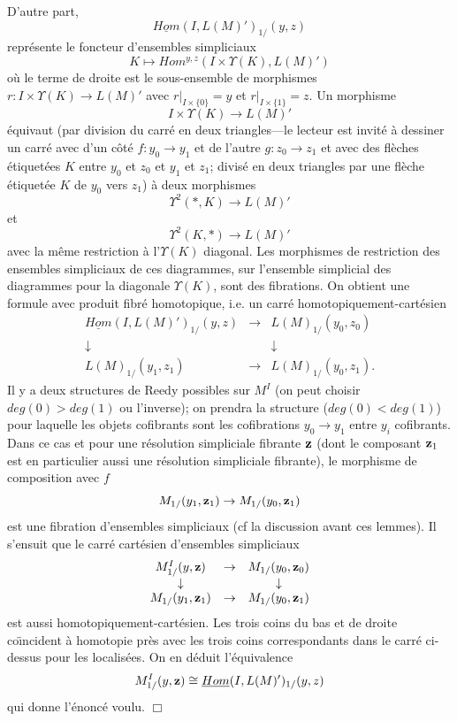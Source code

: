 \documentclass[12pt]{article}
\newcommand{\eop}{\hfill $\Box$\vspace{.1in}}
\begin{document}
D'autre part,
$$
\underline{Hom}(I, L(M)')_{1/}(y,z)
$$
repr\'esente le foncteur d'ensembles simpliciaux
$$
K\mapsto Hom ^{y,z}(I\times \Upsilon (K), L(M)')
$$
o\`u le terme de droite est le sous-ensemble de morphismes
$r:I\times \Upsilon (K)\rightarrow L(M)'$ avec $r|_{I\times \{ 0\} } = y$
et $r|_{I\times \{ 1\} } = z$. Un morphisme
$$
I\times \Upsilon (K)\rightarrow L(M)'
$$
\'equivaut (par division du carr\'e en deux triangles---le lecteur
est invit\'e \`a
dessiner un carr\'e avec d'un c\^ot\'e $f: y_0\rightarrow y_1$ et de l'autre $g:
z_0\rightarrow z_1$ et avec des fl\`eches \'etiquet\'ees $K$ entre $y_0$ et
$z_0$
et $y_1$ et $z_1$; divis\'e en deux triangles par une fl\`eche \'etiquet\'ee $K$
de $y_0$ vers $z_1$) \`a deux morphismes
$$
\Upsilon ^2(\ast , K)\rightarrow
L(M)' $$ et
$$
\Upsilon ^2(K,\ast )\rightarrow L(M)'
$$
avec la m\^eme restriction \`a l'$\Upsilon (K)$ diagonal. Les
morphismes de restriction des ensembles simpliciaux de ces diagrammes, sur
l'ensemble simplicial des diagrammes pour la diagonale $\Upsilon (K)$, sont
des fibrations. On obtient une formule avec produit fibr\'e homotopique,
i.e. un carr\'e homotopiquement-cart\'esien
$$
\begin{array}{ccc}
\underline{Hom}(I, L(M)')_{1/}(y,z)&\rightarrow & L(M)_{1/}(y_0, z_0)\\
\downarrow && \downarrow \\
L(M)_{1/}(y_1, z_1) & \rightarrow &  L(M)_{1/}(y_0, z_1).
\end{array}
$$
Il y a deux structures de Reedy possibles sur $M^I$ (on peut
choisir $deg(0)>deg(1)$ ou l'inverse);  on prendra la structure ($deg(0) <
deg (1)$) pour laquelle les objets cofibrants sont les cofibrations
$y_0\rightarrow y_1$ entre $y_i$ cofibrants. Dans ce cas et pour une
r\'esolution simpliciale fibrante ${\bf z}$ (dont le composant ${\bf z}_1$
est en
particulier aussi une r\'esolution simpliciale fibrante), le morphisme de
composition avec $f$
$$
M_{1/}(y_1, {\bf z}_1)\rightarrow M_{1/}(y_0, {\bf z}_1)
$$
est une fibration d'ensembles simpliciaux (cf la discussion avant ces lemmes).
Il s'ensuit que  le carr\'e cart\'esien d'ensembles simpliciaux
$$
\begin{array}{ccc}
M^I_{1/}(y,{\bf z}) & \rightarrow &  M_{1/}(y_0,{\bf z}_0)\\
\downarrow && \downarrow \\
M_{1/}(y_1,{\bf z}_1)& \rightarrow & M_{1/}(y_0,{\bf z}_1)
\end{array}
$$
est aussi homotopiquement-cart\'esien. Les trois coins
du bas et de droite co\"{\i}ncident
\`a homotopie pr\`es avec les trois coins correspondants dans le carr\'e
ci-dessus pour les localis\'ees. On en d\'eduit l'\'equivalence
$$
M^I_{1/}(y,{\bf z})\cong \underline{Hom}(I, L(M)')_{1/}(y,z)
$$
qui donne l'\'enonc\'e voulu.
\eop
\end{document}
